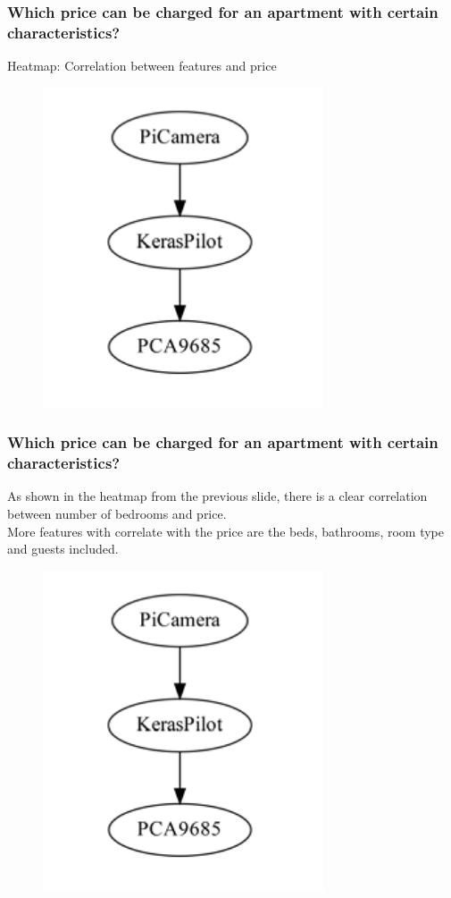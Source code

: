 \documentclass{beamer}
\begin{document}
\begin{frame}
\frametitle{Which price can be charged for an apartment with certain characteristics?}
Heatmap: Correlation between features and price
\begin{figure}
\includegraphics[width=0.8\linewidth]{photo/autonom}
\end{figure}
\end{frame}
\begin{frame}
\frametitle{Which price can be charged for an apartment with certain characteristics?}
As shown in the heatmap from the previous slide, there is a clear correlation between number of bedrooms and price.\\More features with correlate with the price are the beds, bathrooms, room type and guests included.
\begin{figure}
\includegraphics[width=0.8\linewidth]{photo/autonom}
\end{figure}
\end{frame}
\end{document}
